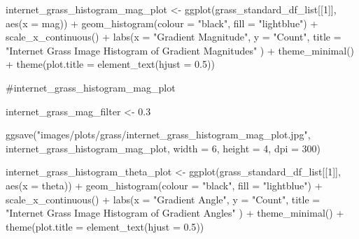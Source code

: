 \documentclass[
  letterpaper,
  DIV=11,
  numbers=noendperiod]{scrreprt}
\newenvironment{Shaded}{\begin{snugshade}}{\end{snugshade}}
\newcommand{\AttributeTok}[1]{\textcolor[rgb]{0.40,0.45,0.13}{#1}}
\newcommand{\CommentTok}[1]{\textcolor[rgb]{0.37,0.37,0.37}{#1}}
\newcommand{\DecValTok}[1]{\textcolor[rgb]{0.68,0.00,0.00}{#1}}
\newcommand{\FloatTok}[1]{\textcolor[rgb]{0.68,0.00,0.00}{#1}}
\newcommand{\FunctionTok}[1]{\textcolor[rgb]{0.28,0.35,0.67}{#1}}
\newcommand{\NormalTok}[1]{\textcolor[rgb]{0.00,0.23,0.31}{#1}}
\newcommand{\OtherTok}[1]{\textcolor[rgb]{0.00,0.23,0.31}{#1}}
\newcommand{\SpecialCharTok}[1]{\textcolor[rgb]{0.37,0.37,0.37}{#1}}
\newcommand{\StringTok}[1]{\textcolor[rgb]{0.13,0.47,0.30}{#1}}
\begin{document}
\begin{Shaded}
\begin{Highlighting}[]
\NormalTok{internet\_grass\_histogram\_mag\_plot }\OtherTok{\textless{}{-}}
  \FunctionTok{ggplot}\NormalTok{(grass\_standard\_df\_list[[}\DecValTok{1}\NormalTok{]], }
         \FunctionTok{aes}\NormalTok{(}\AttributeTok{x =}\NormalTok{ mag)) }\SpecialCharTok{+}
  \FunctionTok{geom\_histogram}\NormalTok{(}\AttributeTok{colour =} \StringTok{"black"}\NormalTok{, }\AttributeTok{fill =} \StringTok{"lightblue"}\NormalTok{) }\SpecialCharTok{+}
  \FunctionTok{scale\_x\_continuous}\NormalTok{() }\SpecialCharTok{+} 
  \FunctionTok{labs}\NormalTok{(}\AttributeTok{x =} \StringTok{"Gradient Magnitude"}\NormalTok{, }
       \AttributeTok{y =} \StringTok{"Count"}\NormalTok{, }
       \AttributeTok{title =} \StringTok{"Internet Grass Image Histogram of Gradient Magnitudes"}
\NormalTok{       ) }\SpecialCharTok{+}
  \FunctionTok{theme\_minimal}\NormalTok{() }\SpecialCharTok{+}
  \FunctionTok{theme}\NormalTok{(}\AttributeTok{plot.title =} \FunctionTok{element\_text}\NormalTok{(}\AttributeTok{hjust =} \FloatTok{0.5}\NormalTok{))}

\CommentTok{\#internet\_grass\_histogram\_mag\_plot}

\NormalTok{internet\_grass\_mag\_filter }\OtherTok{\textless{}{-}} \FloatTok{0.3}

\FunctionTok{ggsave}\NormalTok{(}\StringTok{"images/plots/grass/internet\_grass\_histogram\_mag\_plot.jpg"}\NormalTok{, internet\_grass\_histogram\_mag\_plot, }\AttributeTok{width =} \DecValTok{6}\NormalTok{, }\AttributeTok{height =} \DecValTok{4}\NormalTok{, }\AttributeTok{dpi =} \DecValTok{300}\NormalTok{)}



\NormalTok{internet\_grass\_histogram\_theta\_plot }\OtherTok{\textless{}{-}}
  \FunctionTok{ggplot}\NormalTok{(grass\_standard\_df\_list[[}\DecValTok{1}\NormalTok{]], }
         \FunctionTok{aes}\NormalTok{(}\AttributeTok{x =}\NormalTok{ theta)) }\SpecialCharTok{+}
  \FunctionTok{geom\_histogram}\NormalTok{(}\AttributeTok{colour =} \StringTok{"black"}\NormalTok{, }\AttributeTok{fill =} \StringTok{"lightblue"}\NormalTok{) }\SpecialCharTok{+}
  \FunctionTok{scale\_x\_continuous}\NormalTok{() }\SpecialCharTok{+} 
  \FunctionTok{labs}\NormalTok{(}\AttributeTok{x =} \StringTok{"Gradient Angle"}\NormalTok{, }
       \AttributeTok{y =} \StringTok{"Count"}\NormalTok{, }
       \AttributeTok{title =} \StringTok{"Internet Grass Image Histogram of Gradient Angles"}
\NormalTok{       ) }\SpecialCharTok{+}
  \FunctionTok{theme\_minimal}\NormalTok{() }\SpecialCharTok{+}
  \FunctionTok{theme}\NormalTok{(}\AttributeTok{plot.title =} \FunctionTok{element\_text}\NormalTok{(}\AttributeTok{hjust =} \FloatTok{0.5}\NormalTok{))}


\end{Highlighting}
\end{Shaded}
\end{document}
